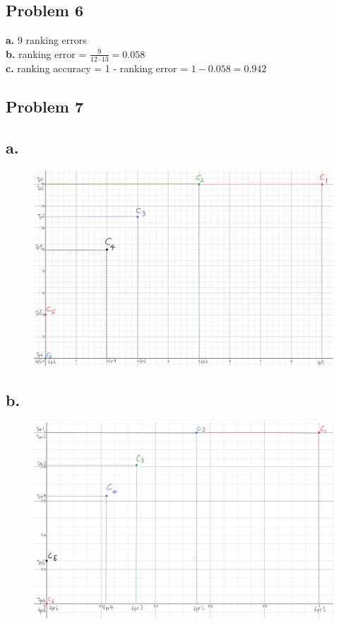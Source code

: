 \documentclass[letter]{article}
\theoremstyle{case}
\begin{document}
\subsection*{Problem 6}
\textbf{a. } 9 ranking errors \\
\textbf{b. } ranking error = $\frac{9}{12 \cdot 13} = 0.058$ \\
\textbf{c. } ranking accuracy = 1 - ranking error = $1 - 0.058 = 0.942$ 

\subsection*{Problem 7}
\subsection*{a. }
\begin{figure}[h!]
	\includegraphics[scale=0.4]{coveragePlot.png}
\end{figure} 
\newpage
\subsection*{b. }
\begin{figure}[h!]
	\includegraphics[scale=0.4]{ROCplot.png}
\end{figure} 
\end{document}

